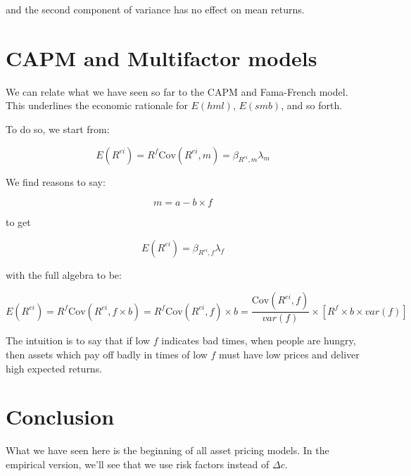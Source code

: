 and the second component of variance has no effect on mean returns.

\section{CAPM and Multifactor models}

We can relate what we have seen so far to the CAPM and Fama-French model. 
This underlines the economic rationale for $E(hml)$, $E(smb)$, and so forth.

To do so, we start from:

\begin{equation}
    E(R^{ei}) = R^f \text{Cov}(R^{ei}, m) = \beta_{R^{ei}, m} \lambda_m
\end{equation}

We find reasons to say:

\begin{equation}
    m = a -b \times f 
\end{equation}

to get 

\begin{equation}
    E(R^{ei}) = \beta_{R^{ei}, f} \lambda_f
\end{equation}

with the full algebra to be:

\begin{equation}
    E(R^{ei}) = R^f \text{Cov}(R^{ei}, f \times b) = R^f \text{Cov}(R^{ei}, f) \times b 
    = \frac{\text{Cov}(R^{ei}, f)}{var(f)} \times [R^f \times b \times var(f)] 
\end{equation}

The intuition is to say that if low $f$ indicates bad times, 
when people are hungry, then assets which pay off badly in times 
of low $f$ must have low prices and deliver high expected returns.




\section{Conclusion}

What we have seen here is the beginning of all asset pricing 
models. In the empirical version, we'll see that 
we use risk factors instead of $\Delta c$.